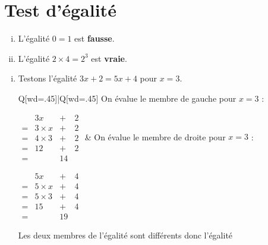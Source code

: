\documentclass[../main.tex]{subfiles}
\begin{document}
    \part{Test d'égalité}
        \begin{exemple}
            \begin{enumerate}[i),font=\bfseries]
                \item L'égalité $0=1$ est {\bfseries fausse}.
                \item L'égalité $2\times 4=2^3$ est {\bfseries vraie}.
            \end{enumerate}
        \end{exemple}
        \begin{exemple}
            \begin{enumerate}[i), font=\bfseries]
                \item Testons l'égalité $3x+2=5x+4$ pour $x=3$.
                \vskip 10pt
                \begin{tblr}{Q[wd=.45\linewidth]|Q[wd=.45\linewidth]}
                    On évalue le membre de gauche pour $x=3$ :
                    \par\vskip 10pt\hskip 30pt
                    $\begin{array}{cccc}
                        &3x&+&2\\
                        =&3\times x&+&2\\
                        =&4\times 3&+&2\\
                        =&12&+&2\\
                        =&&14&
                    \end{array}$
                    &
                    On évalue le membre de droite pour $x=3$ :
                    \par\vskip 10pt\hskip 30pt
                    $\begin{array}{cccc}
                        &5x&+&4\\
                        =&5\times x&+&4\\
                        =&5\times 3&+&4\\
                        =&15&+&4\\
                        =&&19&
                    \end{array}$
                \end{tblr}\vskip 10pt%
                Les deux membres de l'égalité sont différents donc l'égalité

\end{enumerate}
\end{exemple}
\end{document}
